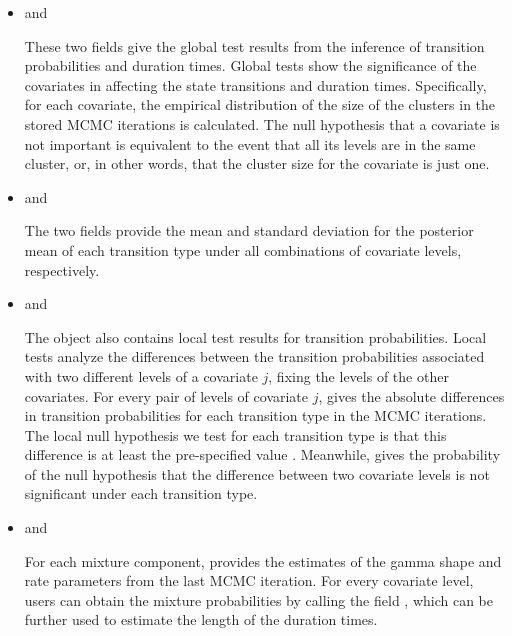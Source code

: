 \begin{itemize}
\item {} and 

These two fields give the global test results from the inference of transition probabilities and duration times. 
Global tests show the significance of the covariates in affecting the state transitions and {duration times}.  
Specifically, for each covariate,  the empirical distribution of the size of the clusters in the stored MCMC iterations is calculated. 
The null hypothesis that a covariate is not important is equivalent to the event that all its levels are in the same cluster, or, in other words, that the cluster size for the covariate is just one.

\item {} and 

The two fields provide the mean and standard deviation for the posterior mean of each transition type under all combinations of covariate levels, respectively. 

\item {} and 

The  object also contains local test results for transition probabilities. 
Local tests analyze the differences between the transition probabilities associated with two different levels of a covariate $j$,  fixing the levels of the other covariates. 
For every pair of levels of covariate $j$,   gives the absolute differences in transition probabilities for each transition type in the MCMC iterations.
The local null hypothesis we test for each transition type is that this difference is at least the pre-specified value .
Meanwhile,  gives the probability of the null hypothesis that the difference between two covariate levels is not significant under each transition type. 

\item {} and 

For each mixture component,   provides the estimates of the gamma shape and rate parameters from the last MCMC iteration.  
{For every covariate level, users can obtain the mixture probabilities by calling the field  ,  which can be further used to estimate the length of the {duration times}.} 
\end{itemize}
 


